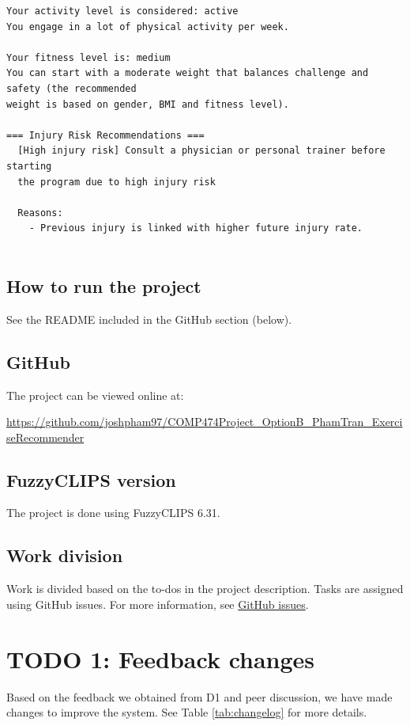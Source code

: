 \documentclass{article}
\begin{document}
\begin{verbatim}
Your activity level is considered: active
You engage in a lot of physical activity per week.

Your fitness level is: medium
You can start with a moderate weight that balances challenge and safety (the recommended 
weight is based on gender, BMI and fitness level).

=== Injury Risk Recommendations ===
  [High injury risk] Consult a physician or personal trainer before starting 
  the program due to high injury risk

  Reasons:
    - Previous injury is linked with higher future injury rate.
    
\end{verbatim}

\subsection{How to run the project}

See the README included in the GitHub section (below).

\subsection{GitHub}

The project can be viewed online at:

\url{https://github.com/joshpham97/COMP474Project_OptionB_PhamTran_ExerciseRecommender}

\subsection{FuzzyCLIPS version}

The project is done using FuzzyCLIPS 6.31.

\subsection{Work division}

Work is divided based on the to-dos in the project description. Tasks are assigned using GitHub issues. For more information, see \href{https://github.com/joshpham97/COMP474Project_OptionB_PhamTran_ExerciseRecommender/issues?q=is%3Aissue}{GitHub issues}.

\section{TODO 1: Feedback changes}

Based on the feedback we obtained from D1 and peer discussion, we have made changes to improve the system. See Table \ref{tab:changelog} for more details.
\end{document}
